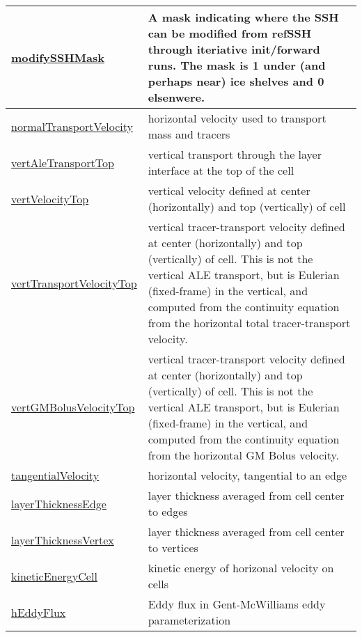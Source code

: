 {\begin{center}
\begin{longtable}{| p{2.0in} | p{4.0in} |}
    \hline
    \hyperref[subsec:var_sec_diagnostics_modifySSHMask]{modifySSHMask} & A mask indicating where the SSH can be modified from refSSH through iteriative init/forward runs.  The mask is 1 under (and perhaps near) ice shelves and 0 elsenwere. \\
    \hline
    \hyperref[subsec:var_sec_diagnostics_normalTransportVelocity]{normalTransportVelocity} & horizontal velocity used to transport mass and tracers \\
    \hline
    \hyperref[subsec:var_sec_diagnostics_vertAleTransportTop]{vertAleTransportTop} & vertical transport through the layer interface at the top of the cell \\
    \hline
    \hyperref[subsec:var_sec_diagnostics_vertVelocityTop]{vertVelocityTop} & vertical velocity defined at center (horizontally) and top (vertically) of cell \\
    \hline
    \hyperref[subsec:var_sec_diagnostics_vertTransportVelocityTop]{vertTransportVelocityTop} & vertical tracer-transport velocity defined at center (horizontally) and top (vertically) of cell.  This is not the vertical ALE transport, but is Eulerian (fixed-frame) in the vertical, and computed from the continuity equation from the horizontal total tracer-transport velocity. \\
    \hline
    \hyperref[subsec:var_sec_diagnostics_vertGMBolusVelocityTop]{vertGMBolusVelocityTop} & vertical tracer-transport velocity defined at center (horizontally) and top (vertically) of cell.  This is not the vertical ALE transport, but is Eulerian (fixed-frame) in the vertical, and computed from the continuity equation from the horizontal GM Bolus velocity. \\
    \hline
    \hyperref[subsec:var_sec_diagnostics_tangentialVelocity]{tangentialVelocity} & horizontal velocity, tangential to an edge \\
    \hline
    \hyperref[subsec:var_sec_diagnostics_layerThicknessEdge]{layerThicknessEdge} & layer thickness averaged from cell center to edges \\
    \hline
    \hyperref[subsec:var_sec_diagnostics_layerThicknessVertex]{layerThicknessVertex} & layer thickness averaged from cell center to vertices \\
    \hline
    \hyperref[subsec:var_sec_diagnostics_kineticEnergyCell]{kineticEnergyCell} & kinetic energy of horizonal velocity on cells \\
    \hline
    \hyperref[subsec:var_sec_diagnostics_hEddyFlux]{hEddyFlux} & Eddy flux in Gent-McWilliams eddy parameterization \\

\end{longtable}
\end{center}}
